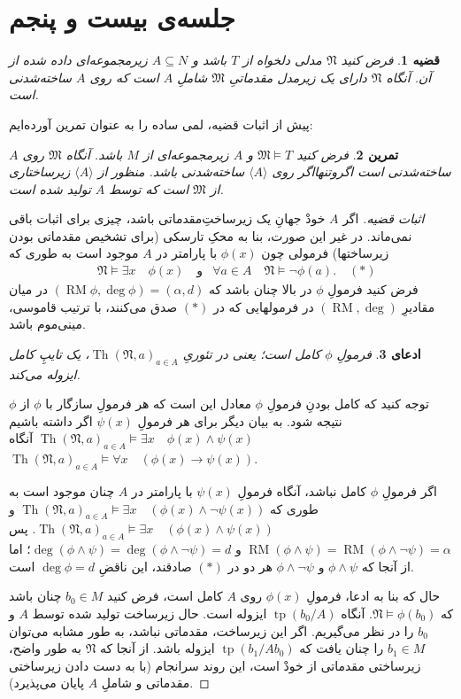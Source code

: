\documentclass[12pt,a4paper]{report}
\theoremstyle{colorhead}
\newtheorem{thm}{قضیه}
\newtheorem{tam}[thm]{تمرین}
\newtheorem{claim}[thm]{ادعای}
\DeclareMathOperator{\Th}{Th}
\DeclareMathOperator{\RM}{RM}
\DeclareMathOperator{\tp}{tp}
\begin{document}
\pagebreak 
\section{	جلسه‌ی بیست و پنجم}
\begin{thm}
فرض کنید
$\mathfrak{N}$
مدلی دلخواه از
$T$
باشد و 
$A\subseteq N$
زیرمجموعه‌ای داده شده از آن. آنگاه 
$\mathfrak{N}$
دارای یک زیرمدل مقدماتیِ 
$\mathfrak{M}$
شاملِ
$A$
است که روی
$A$
ساخته‌شدنی است. 
\end{thm}
پیش از اثبات قضیه، لمی ساده را به عنوان تمرین آورده‌ایم:
\begin{tam}
فرض کنید
$\mathfrak{M}\models T$
و
$A$
زیرمجموعه‌ای از
$M$
باشد. آنگاه
$\mathfrak{M}$
روی
$A$
ساخته‌شدنی است اگروتنهااگر روی
$\langle A\rangle$
ساخته‌شدنی باشد. منظور از
$\langle A\rangle$
زیرساختاری از
$\mathfrak{M}$
است که توسط 
$A$
تولید شده است. 
\end{tam}
\begin{proof}[اثبات قضیه]
اگر
$A$
خودْ جهانِ یک زیرساختِ‌مقدماتی باشد، چیزی برای اثبات باقی نمی‌ماند. در غیر این صورت، بنا به محکِ تارسکی (برای تشخیص مقدماتی بودن زیرساختها)
فرمولی چون
$\phi(x)$
با پارامتر در
$A$
موجود است به طوری که
\begin{align*}
& \mathfrak{N}\models \exists x\quad \phi(x)\quad  \text{و}
& \forall a\in A \quad \mathfrak{N}\models \neg \phi(a). \quad (*)
\end{align*}
فرض کنید
فرمولِ
$\phi$
در بالا چنان باشد که 	
$(\RM\phi, \deg \phi)=(\alpha
,d)$
در میان 
مقادیرِ
$(\RM,\deg)$
در
فرمولهایی که در
$(*)$
صدق می‌کنند، با ترتیب قاموسی، مینی‌موم باشد. 
\begin{claim}
فرمولِ
$\phi$
کامل است؛ یعنی  در تئوریِ
$\Th(\mathfrak{N},a)_{a\in A}$،
یک تایپِ کامل ایزوله می‌کند. 
\end{claim}
توجه کنید که کامل بودنِ فرمولِ
$\phi$
معادل این است که هر فرمولِ
سازگار با
$\phi$
از  
$\phi$
نتیجه شود. به بیان دیگر  برای هر فرمولِ
$\psi(x)$
اگر داشته باشیم
$\Th(\mathfrak{N},a)_{a\in A}\models \exists x\quad \phi(x)\wedge \psi(x)$
آنگاه
$\Th(\mathfrak{N},a)_{a\in A}\models \forall x\quad (\phi(x)\to \psi(x))$.
\par 
اگر فرمولِ
$\phi$
کامل نباشد، آنگاه فرمولِ
$\psi(x)$
با پارامتر در
$A$
چنان موجود است به طوری که
$\Th(\mathfrak{N},a)_{a\in A}\models \exists x\quad (\phi(x)\wedge \neg \psi(x))$
و
$\Th(\mathfrak{N},a)_{a\in A}\models \exists x\quad (\phi(x)\wedge \psi(x))$.
پس
$\RM(\phi\wedge \psi)=\RM(\phi\wedge \neg \psi)=\alpha$
و
$\deg(\phi\wedge \psi)=\deg (\phi\wedge \neg \psi)=d$؛
اما 
از آنجا که 
$\phi\wedge\psi$
و
$\phi\wedge\neg \psi$
هر دو در 
$(*)$
صادقند، 
این ناقضِ
$\deg \phi=d$
است. 
\par 
حال که بنا به ادعا، فرمولِ
$\phi(x)$
روی
$A$
کامل است، فرض کنید
$b_0\in M$
چنان باشد که
\mbox{$\mathfrak{N}\models \phi(b_0)$}.
آنگاه
$\tp(b_0/A)$
ایزوله است. حال زیرساخت تولید شده توسط
$A$
و
$b_0$
را در نظر می‌گیریم. اگر این زیرساخت، مقدماتی نباشد، به طور مشابه می‌توان 
$b_1\in M$
را چنان یافت که 
$\tp(b_1/Ab_0)$
ایزوله باشد. از آنجا که
$\mathfrak{N}$
به طور واضح، زیرساختی مقدماتی از خودْ است، این روند سرانجام 
(با به دست دادن زیرساختی مقدماتی و شاملِ
$A$
پایان می‌پذیرد).
\end{proof}
\end{document}
